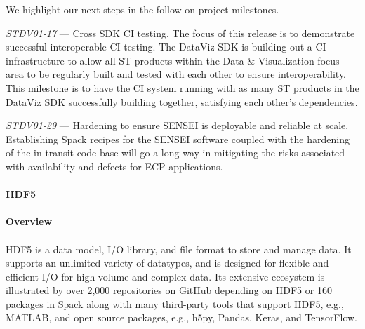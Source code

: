 We highlight our next steps in the follow on project milestones.

\textit{STDV01-17} --- Cross SDK CI testing. The focus of this release is to demonstrate successful interoperable CI testing. The DataViz SDK is building out a CI infrastructure to allow all ST products within the Data \& Visualization focus area to be regularly built and tested with each other to ensure interoperability. This milestone is to have the CI system running with as many ST products in the DataViz SDK successfully building together, satisfying each other's dependencies.

\textit{STDV01-29} --- Hardening to ensure SENSEI is deployable and reliable at scale. Establishing Spack recipes for the SENSEI software coupled with the hardening of the in transit code-base will go a long way in mitigating the risks associated with availability and defects for ECP applications. 

\paragraph{HDF5}
\paragraph{Overview}
\paragraph{}
HDF5 is a data model, I/O library, and file format to store and manage data. It supports an unlimited variety of datatypes, and is designed for flexible and efficient I/O for high volume and complex data. Its extensive ecosystem is illustrated by over 2,000 repositories on GitHub depending on HDF5 or 160 packages in Spack along with many third-party tools that support HDF5, e.g., MATLAB, and open source packages, e.g., h5py, Pandas, Keras, and TensorFlow. 

